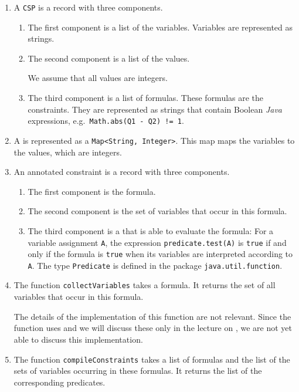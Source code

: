 \begin{enumerate}
\item A \texttt{CSP} is a record with three components.
  \begin{enumerate}
  \item The first component is a list of the variables.  Variables are represented as strings.
  \item The second component is a list of the values.

        We assume that all values are integers.
  \item The third component is a list of formulas.
        These formulas are the constraints.  They are represented as strings that contain Boolean
        \textsl{Java} expressions, e.g.~\texttt{Math.abs(Q1 - Q2) != 1}.
  \end{enumerate}
\item A  is represented as a \texttt{Map<String, Integer>}.  This map maps the
      variables to the values, which are integers.
\item An annotated constraint is a record with three components.
  \begin{enumerate}
  \item The first component is the formula.
  \item The second component is the set of variables that occur in this formula.
  \item The third component is a  that is able to evaluate the formula:  For a variable
        assignment \texttt{A}, the expression \texttt{predicate.test(A)} is \texttt{true} if and only if the
        formula is \texttt{true} when its variables are interpreted according to \texttt{A}.  The type
        \texttt{Predicate} is defined in the package \texttt{java.util.function}.
  \end{enumerate}
\item The function \texttt{collectVariables} takes a formula.  It returns the
      set of all variables that occur in this formula.

      The details of the implementation of this function are not relevant.  Since the function uses
       and we will discuss these only in the lecture on ,
      we are not yet able to discuss this implementation.
\item The function \texttt{compileConstraints} takes a list of formulas and the list of the sets of variables
      occurring in these formulas.  It returns the list of the corresponding predicates.


\end{enumerate}
